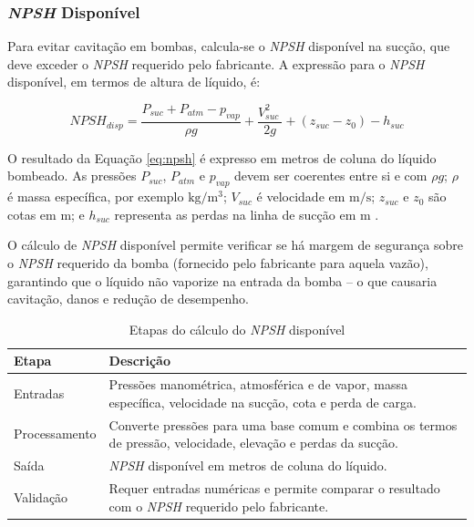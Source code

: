 \subsubsection{\textit{NPSH} Disponível}

Para evitar cavitação em bombas, calcula-se o \textit{NPSH} disponível na sucção, que deve exceder o \textit{NPSH} requerido pelo fabricante. A expressão para o \textit{NPSH} disponível, em termos de altura de líquido, é:

\begin{equation}
N P S H_{d i s p} = \frac{P_{s u c} + P_{a t m} - p_{v a p}}{\rho g} + \frac{V_{s u c}^{2} \ }{2 g} + \left( z_{s u c} - z_{0} \right) - h_{s u c}
\label{eq:npsh}
\end{equation}

O resultado da Equação \ref{eq:npsh} é expresso em metros de coluna do líquido bombeado. As pressões $P_{suc}$, $P_{atm}$ e $p_{vap}$ devem ser coerentes entre si e com $\rho g$; $\rho$ é massa específica, por exemplo $\mathrm{kg/m^3}$; $V_{suc}$ é velocidade em $\mathrm{m/s}$; $z_{suc}$ e $z_0$ são cotas em $\mathrm{m}$; e $h_{suc}$ representa as perdas na linha de sucção em $\mathrm{m}$ \cite{perry2007}.

O cálculo de \textit{NPSH} disponível permite verificar se há margem de segurança sobre o \textit{NPSH} requerido da bomba (fornecido pelo fabricante para aquela vazão), garantindo que o líquido não vaporize na entrada da bomba – o que causaria cavitação, danos e redução de desempenho.

\begin{table}[H]
    \centering
    \caption{Etapas do cálculo do \textit{NPSH} disponível}
    \label{tab:fluxo-npsh-disponivel}
    \small
    \begin{tabular}{p{}p{}}
        \hline
        \textbf{Etapa} & \textbf{Descrição} \\
        \hline
        Entradas & Pressões manométrica, atmosférica e de vapor, massa específica, velocidade na sucção, cota e perda de carga. \\
        Processamento & Converte pressões para uma base comum e combina os termos de pressão, velocidade, elevação e perdas da sucção. \\
        Saída & \textit{NPSH} disponível em metros de coluna do líquido. \\
        Validação & Requer entradas numéricas e permite comparar o resultado com o \textit{NPSH} requerido pelo fabricante. \\
        \hline
    \end{tabular}
\end{table}
